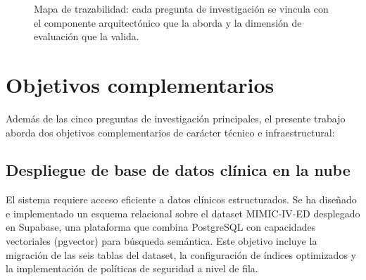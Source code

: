 \begin{figure}[H]
{
}%
\caption{Mapa de trazabilidad: cada pregunta de investigación se vincula con el componente arquitectónico que la aborda y la dimensión de evaluación que la valida.}
\label{fig:rq_roadmap}
\end{figure}

\section{Objetivos complementarios}
\label{sec:objetivos_complementarios}

Además de las cinco preguntas de investigación principales, el presente trabajo aborda dos objetivos complementarios de carácter técnico e infraestructural:

\subsection{Despliegue de base de datos clínica en la nube}

El sistema requiere acceso eficiente a datos clínicos estructurados. Se ha diseñado e implementado un esquema relacional sobre el dataset \acs{MIMIC}-IV-\acs{ED} \parencite{johnson2023mimiciv} desplegado en Supabase, una plataforma que combina PostgreSQL con capacidades vectoriales (pgvector) para búsqueda semántica. Este objetivo incluye la migración de las seis tablas del dataset, la configuración de índices optimizados y la implementación de políticas de seguridad a nivel de fila.

